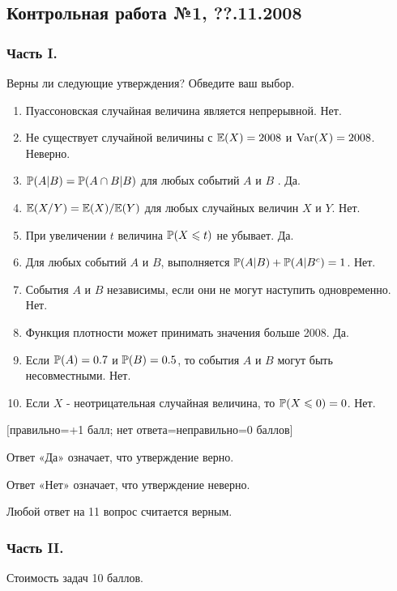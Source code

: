 \documentclass[12pt, a4paper]{article}\usepackage[]{graphicx}\usepackage[]{color}
\begin{document}
\subsection{Контрольная работа №1, ??.11.2008}

\subsubsection*{Часть I.}

Верны ли следующие утверждения? Обведите ваш выбор.

\begin{enumerate}
\item Пуассоновская случайная величина является непрерывной. Нет.
\item Не существует случайной величины с $\E(X)=2008$ и $\Var(X)=2008$. Неверно.
\item $\P(A|B)=\P(A\cap B|B)$ для любых событий $A$ и $B$ . Да.
\item $\E(X/Y)=\E(X)/\E(Y)$ для любых случайных величин $X$ и $Y$. Нет.
\item При увеличении $t$ величина $\P(X\le t)$ не убывает. Да.
\item Для любых событий $A$ и $B$, выполняется $\P(A|B)+\P(A|B^{c})=1$. Нет.
\item События $A$ и $B$ независимы, если они не могут наступить одновременно. Нет.
\item Функция плотности может принимать значения больше 2008. Да.
\item Если $\P(A)=0.7$ и $\P(B)=0.5$, то события $A$ и $B$ могут быть несовместными. Нет.
\item Если $X$ - неотрицательная случайная величина, то $\P(X\le 0)=0$. Нет.
\end{enumerate}

$[$правильно=+1 балл; нет ответа=неправильно=0 баллов$]$

Ответ «Да» означает, что утверждение верно.

Ответ «Нет» означает, что утверждение неверно.

Любой ответ на 11 вопрос считается верным.

\subsubsection*{Часть II.}

Стоимость задач 10 баллов.

\end{document}
